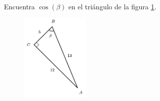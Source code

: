 Encuentra $\cos(\beta)$ en el triángulo de la figura \ref{fig:functrig03}.
\begin{figure}[H]
    \begin{center}
        \includegraphics[width=0.3\textwidth]{../images/functrig03.png}
    \end{center}
    \caption{}
    \label{fig:functrig03}
\end{figure}
